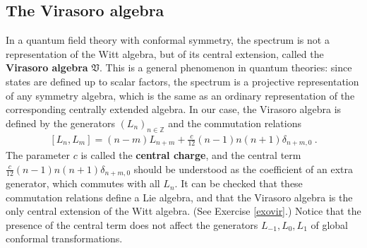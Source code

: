 \documentclass[12pt,a4paper,notitlepage]{report}
\newcommand \Z {\mathbb{Z}}
\numberwithin{equation}{section}
\theoremstyle{break}
\begin{document}
\subsection{The Virasoro algebra \label{secvir}}

In a quantum field theory with conformal symmetry, the spectrum is not a representation of the Witt algebra, but of 
its central extension, called the \textbf{\boldmath Virasoro algebra} $\mathfrak{V}$. This is a general phenomenon in quantum theories: since states are defined up to scalar factors, the spectrum is a projective representation of any symmetry algebra, which is the same as an ordinary representation of the corresponding centrally extended algebra. 
In our case, the Virasoro algebra is defined by the generators $(L_n)_{n\in \Z}$ and the commutation relations
\begin{align}
 \boxed{[L_n,L_m]=(n-m)L_{n+m} + \frac{c}{12} (n-1)n(n+1) \delta_{n+m,0}}\ .
\label{vir}
\end{align}
The parameter $c$ is called the \textbf{\boldmath central charge}, and the central term $\frac{c}{12} (n-1)n(n+1) \delta_{n+m,0}$ should be understood as the coefficient of an extra generator, which commutes with all $L_n$. It can be checked that these commutation relations define a Lie algebra, and that the Virasoro algebra is the only central extension of the Witt algebra. (See Exercise \ref{exovir}.) Notice that the presence of the central term does not affect the generators $L_{-1},L_0,L_1$ of global conformal transformations. 
\end{document}
